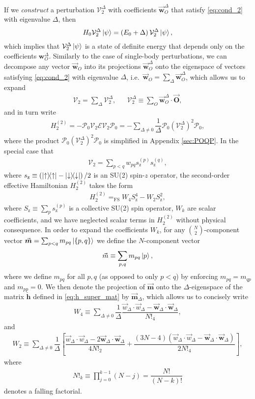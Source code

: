 \documentclass[nofootinbib,notitlepage,11pt]{revtex4-2}
\newcommand{\f}[2]{\dfrac{#1}{#2}} %
\newcommand{\p}[1]{\left(#1\right)} %
\renewcommand{\sp}[1]{\left[#1\right]} %
\renewcommand{\set}[1]{\left\{#1\right\}} %
\renewcommand{\c}{\cdot} %
\newcommand{\m}{\bm} %
\renewcommand{\v}{\vec} %
\newcommand{\1}{\mathds{1}}
\newcommand{\up}{\uparrow}
\newcommand{\dn}{\downarrow}
\newcommand{\z}{\text{z}}
\newcommand{\E}{\mathcal{E}}
\renewcommand{\P}{\mathcal{P}}
\newcommand{\V}{\mathcal{V}}
\newcommand{\EQFS}{=_{\text{FS}}}
\begin{document}
If we {\it construct} a perturbation $\V_2^\Delta$ with coefficients
$\v{\m w}_O^\Delta$ that satisfy \eqref{eq:cond_2} with eigenvalue
$\Delta$, then
\begin{align}
  H_0 \V_2^\Delta \ket\psi = \p{E_0 + \Delta} \V_2^\Delta \ket\psi,
\end{align}
which implies that $\V_2^\Delta\ket\psi$ is a state of definite energy
that depends only on the coefficients $\m w_O^\Delta$.  Similarly to
the case of single-body perturbations, we can decompose any vector
$\v{\m w}_O$ into its projections $\v{\m w}_O^\Delta$ onto the
eigenspace of vectors satisfying \eqref{eq:cond_2} with eigenvalue
$\Delta$, i.e.~$\v{\m w}_O=\sum_\Delta\v{\m w}_O^\Delta$, which allows
us to expand
\begin{align}
  \V_2 = \sum_\Delta \V_2^\Delta,
  &&
  \V_2^\Delta \equiv \sum_O \v{\m w}_O^\Delta \c \v{\m O},
\end{align}
and in turn write
\begin{align}
  H_2^{(2)} = - \P_0 \V_2 \E \V_2 \P_0
  = -\sum_{\Delta\ne0} \f1\Delta \P_0 \p{\V_2^\Delta}^2 \P_0,
\end{align}
where the product $\P_0 \p{\V_2^\Delta}^2 \P_0$ is simplified in
Appendix \ref{sec:POQP}.  In the special case that
\begin{align}
  \V_2 = \sum_{p<q} w_{pq} s_\z^{(p)} s_\z^{(q)},
\end{align}
where $s_\z\equiv\p{\op\up-\op\dn}/2$ is an SU(2) spin-$z$ operator,
the second-order effective Hamiltonian $H_2^{(2)}$ takes the form
\begin{align}
  H_2^{(2)} \EQFS W_4 S_\z^4 - W_2 S_\z^2,
\end{align}
where $S_\z\equiv\sum_p s_\z^{(p)}$ is a collective SU(2) spin
operator, $W_k$ are scalar coefficients, and we have neglected scalar
terms in $H_2^{(2)}$ without physical consequence.  In order to expand
the coefficients $W_k$, for any ${N \choose 2}$-component vector
$\v{\m m}=\sum_{p<q}m_{pq}\ket{\set{p,q}}$ we define the $N$-component
vector
\begin{align}
  \v m \equiv \sum_{p,q} m_{pq} \ket{p},
\end{align}
where we define $m_{pq}$ for all $p,q$ (as opposed to only $p<q$) by
enforcing $m_{pq}=m_{qp}$ and $m_{pp}=0$.  We then denote the
projection of $\v{\m m}$ onto the $\Delta$-eigenspace of the matrix
$\check{\m h}$ defined in \eqref{eq:h_super_mat} by $\v{\m m}_\Delta$,
which allows us to concisely write
\begin{align}
  W_4
  \equiv \sum_{\Delta\ne0} \f1\Delta \f{\v w_\Delta\c\v w_\Delta
    - \v{\m w}_\Delta\c\v{\m w}_\Delta}{N!_4},
\end{align}
and
\begin{align}
  W_2
  \equiv \sum_{\Delta\ne0} \f1{\Delta} \sp{\f{\v w_\Delta\c\v w_\Delta
      - 2\v{\m w}_\Delta\c\v{\m w}_\Delta}{4N!_2}
    + \f{\p{3N-4}\p{\v w_\Delta\c\v w_\Delta
        - \v{\m w}_\Delta\c\v{\m w}_\Delta}}{2N!_4}},
\end{align}
where
\begin{align}
  N!_k \equiv \prod_{j=0}^{k-1} \p{N-j} = \f{N!}{\p{N-k}!}
\end{align}
denotes a falling factorial.
\end{document}
